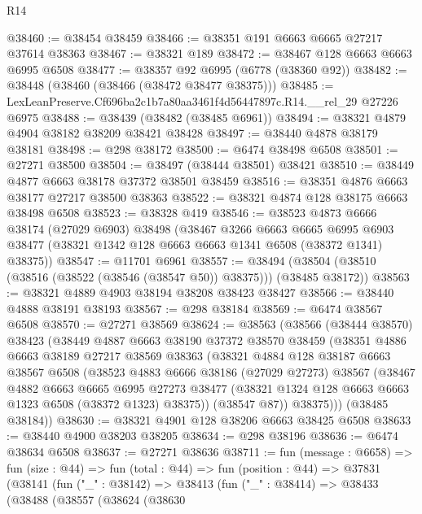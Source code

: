 \begin{lexlean}{R14}
\begin{coremodule}
@38460 := @38454 @38459
@38466 := @38351 @191 @6663 @6665 @27217 @37614 @38363
@38467 := @38321 @189
@38472 := @38467 @128 @6663 @6663 @6995 @6508
@38477 := @38357 @92 @6995 (@6778 (@38360 @92))
@38482 := @38448 (@38460 (@38466 (@38472 @38477 @38375)))
@38485 := LexLeanPreserve.Cf696ba2c1b7a80aa3461f4d56447897c.R14.__rel_29 @27226 @6975
@38488 := @38439 (@38482 (@38485 @6961))
@38494 := @38321 @4879 @4904 @38182 @38209 @38421 @38428
@38497 := @38440 @4878 @38179 @38181
@38498 := @298 @38172
@38500 := @6474 @38498 @6508
@38501 := @27271 @38500
@38504 := @38497 (@38444 @38501) @38421
@38510 := @38449 @4877 @6663 @38178 @37372 @38501 @38459
@38516 := @38351 @4876 @6663 @38177 @27217 @38500 @38363
@38522 := @38321 @4874 @128 @38175 @6663 @38498 @6508
@38523 := @38328 @419
@38546 := @38523
    @4873
    @6666
    @38174
    (@27029 @6903)
    @38498
    (@38467
      @3266
      @6663
      @6665
      @6995
      @6903
      @38477
      (@38321 @1342 @128 @6663 @6663 @1341 @6508 (@38372 @1341) @38375))
@38547 := @11701 @6961
@38557 := @38494 (@38504 (@38510 (@38516 (@38522 (@38546 (@38547 @50)) @38375))) (@38485 @38172))
@38563 := @38321 @4889 @4903 @38194 @38208 @38423 @38427
@38566 := @38440 @4888 @38191 @38193
@38567 := @298 @38184
@38569 := @6474 @38567 @6508
@38570 := @27271 @38569
@38624 := @38563
    (@38566
      (@38444 @38570)
      @38423
      (@38449
        @4887
        @6663
        @38190
        @37372
        @38570
        @38459
        (@38351
          @4886
          @6663
          @38189
          @27217
          @38569
          @38363
          (@38321
            @4884
            @128
            @38187
            @6663
            @38567
            @6508
            (@38523
              @4883
              @6666
              @38186
              (@27029 @27273)
              @38567
              (@38467
                @4882
                @6663
                @6665
                @6995
                @27273
                @38477
                (@38321 @1324 @128 @6663 @6663 @1323 @6508 (@38372 @1323) @38375))
              (@38547 @87))
            @38375)))
      (@38485 @38184))
@38630 := @38321 @4901 @128 @38206 @6663 @38425 @6508
@38633 := @38440 @4900 @38203 @38205
@38634 := @298 @38196
@38636 := @6474 @38634 @6508
@38637 := @27271 @38636
@38711 := fun (message : @6658) =>
  fun (size : @44) =>
  fun (total : @44) =>
  fun (position : @44) =>
  @37831
    (@38141
      (fun ("_" : @38142) =>
      @38413
        (fun ("_" : @38414) =>
        @38433
          (@38488
            (@38557
              (@38624
                (@38630

\end{coremodule}
\end{lexlean}
